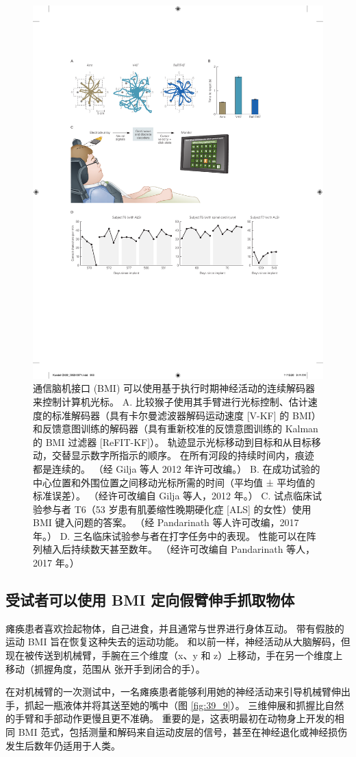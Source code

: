 \begin{figure}[htbp]
	\centering
	\includegraphics[width=0.5\linewidth]{chap39/fig_39_8}
	\caption{通信脑机接口 (BMI) 可以使用基于执行时期神经活动的连续解码器来控制计算机光标。 
		A. 比较猴子使用其手臂进行光标控制、估计速度的标准解码器（具有卡尔曼滤波器解码运动速度 [V-KF] 的 BMI）和反馈意图训练的解码器（具有重新校准的反馈意图训练的 Kalman 的 BMI 过滤器 [ReFIT-KF]）。 
		轨迹显示光标移动到目标和从目标移动，交替显示数字所指示的顺序。 在所有河段的持续时间内，痕迹都是连续的。 
		（经 Gilja 等人 2012 年许可改编。）
		B. 在成功试验的中心位置和外围位置之间移动光标所需的时间（平均值 ± 平均值的标准误差）。 
		（经许可改编自 Gilja 等人，2012 年。）
		C. 试点临床试验参与者 T6（53 岁患有肌萎缩性晚期硬化症 [ALS] 的女性）使用 BMI 键入问题的答案。 
		（经 Pandarinath 等人许可改编，2017 年。）
		D. 三名临床试验参与者在打字任务中的表现。 性能可以在阵列植入后持续数天甚至数年。 
		（经许可改编自 Pandarinath 等人，2017 年。）}
	\label{fig:39_8}
\end{figure}


\subsection{受试者可以使用 BMI 定向假臂伸手抓取物体}

瘫痪患者喜欢捡起物体，自己进食，并且通常与世界进行身体互动。
带有假肢的运动 BMI 旨在恢复这种失去的运动功能。 
和以前一样，神经活动从大脑解码，但现在被传送到机械臂，手腕在三个维度（x、y 和 z）上移动，手在另一个维度上移动（抓握角度，范围从 张开手到闭合的手）。


在对机械臂的一次测试中，一名瘫痪患者能够利用她的神经活动来引导机械臂伸出手，抓起一瓶液体并将其送至她的嘴中（图 \ref{fig:39_9}）。
三维伸展和抓握比自然的手臂和手部动作更慢且更不准确。
重要的是，这表明最初在动物身上开发的相同 BMI 范式，包括测量和解码来自运动皮层的信号，甚至在神经退化或神经损伤发生后数年仍适用于人类。


